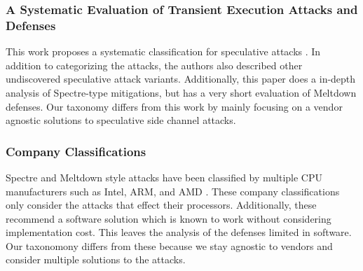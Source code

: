 \subsubsection{A Systematic Evaluation of Transient Execution Attacks and Defenses}

This work proposes a systematic classification for speculative attacks \cite{b48}. 
In addition to categorizing the attacks, the authors also described other undiscovered speculative attack variants.
Additionally, this paper does a in-depth analysis of Spectre-type mitigations, but has a very short evaluation of Meltdown defenses.
Our taxonomy differs from this work by mainly focusing on a vendor agnostic solutions to speculative side channel attacks.

\subsubsection{Company Classifications}

Spectre and Meltdown style attacks have been classified by multiple CPU manufacturers such as Intel, ARM, and AMD \cite{b55, b16, b53}.
These company classifications only consider the attacks that effect their processors.
Additionally, these recommend a software solution which is known to work without considering implementation cost.
This leaves the analysis of the defenses limited in software.
Our taxonomony differs from these because we stay agnostic to vendors and consider multiple solutions to the attacks. 
